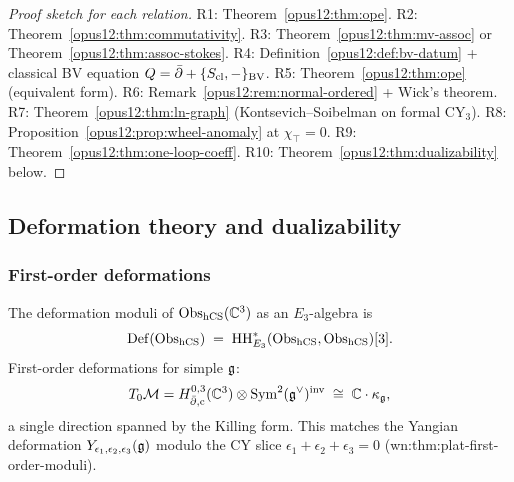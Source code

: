 \begin{proof}[Proof sketch for each relation]
R1: Theorem~\ref{opus12:thm:ope}.
R2: Theorem~\ref{opus12:thm:commutativity}.
R3: Theorem~\ref{opus12:thm:mv-assoc} or
Theorem~\ref{opus12:thm:assoc-stokes}.
R4: Definition~\ref{opus12:def:bv-datum} + classical BV equation
$Q = \bar\partial + \{S_{\mathrm{cl}}, -\}_{\mathrm{BV}}$.
R5: Theorem~\ref{opus12:thm:ope} (equivalent form).
R6: Remark~\ref{opus12:rem:normal-ordered} + Wick's theorem.
R7: Theorem~\ref{opus12:thm:ln-graph} (Kontsevich--Soibelman on
formal CY$_3$).
R8: Proposition~\ref{opus12:prop:wheel-anomaly} at $\chi_\top = 0$.
R9: Theorem~\ref{opus12:thm:one-loop-coeff}.
R10: Theorem~\ref{opus12:thm:dualizability} below.
\end{proof}

\subsection{Deformation theory and dualizability}
\label{opus12:sec:def-dual}

\subsubsection{First-order deformations}

\begin{theorem}\ClaimStatusTheorem
\label{opus12:thm:deformation-moduli}
The deformation moduli of $\mathrm{Obs}_{\mathrm{hCS}}(\mathbb{C}^3)$ as an $E_3$-algebra
is
\[
\mathrm{Def}(\mathrm{Obs}_{\mathrm{hCS}}) \;=\; \mathrm{HH}^*_{E_3}(\mathrm{Obs}_{\mathrm{hCS}},
\mathrm{Obs}_{\mathrm{hCS}})[3].
\]
First-order deformations for simple $\mathfrak{g}$:
\[
T_0 \mathcal M = H^{0,3}_{\bar\partial, \mathrm{c}}(\mathbb{C}^3)
\otimes \mathrm{Sym}^2(\mathfrak{g}^\vee)^{\mathrm{inv}}
\;\cong\; \mathbb{C} \cdot \kappa_{\mathfrak{g}},
\]
a single direction spanned by the Killing form. This matches the
Yangian deformation $Y_{\epsilon_1, \epsilon_2, \epsilon_3}(\mathfrak{g})$
modulo the CY slice $\epsilon_1 + \epsilon_2 + \epsilon_3 = 0$
(wn:thm:plat-first-order-moduli).
\end{theorem}

